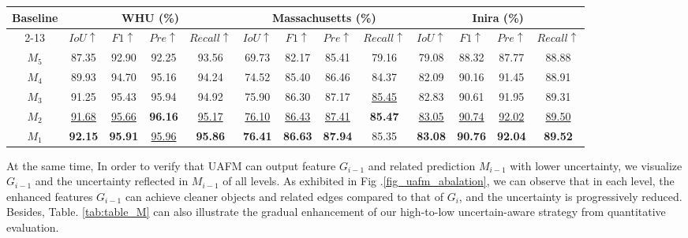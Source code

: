 \documentclass[lettersize,journal]{IEEEtran}
\begin{document}
\begin{table*}[]
\center
\normalsize
\setlength\tabcolsep{3pt}
\caption{The results about $M_{i}$ on the test dataset.}
\label{tab:table_M}
\begin{tabular}{c|cccc|cccc|cccc}
\hline
\multirow{2}{*}{Baseline} & \multicolumn{4}{c|}{WHU (\%)}&\multicolumn{4}{c|}{Massachusetts (\%)} &\multicolumn{4}{c}{Inira (\%)}                                             
 \\ \cline{2-13} 
 & $IoU\uparrow$ & $F1\uparrow$ & $Pre\uparrow$ & $Recall\uparrow$ 
 & $IoU\uparrow$ & $F1\uparrow$ & $Pre\uparrow$ & $Recall\uparrow$
 & $IoU\uparrow$ & $F1\uparrow$ & $Pre\uparrow$ & $Recall\uparrow$ \\ \hline
$M_{5}$&
87.35  &92.90 &92.25 &93.56
&69.73 &82.17 &85.41 &79.16
&79.08 &88.32 &87.77 &88.88\\
$M_{4}$&
89.93 &94.70 &95.16 &94.24
&74.52 &85.40 &86.46 &84.37
&82.09 &90.16 &91.45 &88.91\\ 
$M_{3}$ &
91.25 &95.43 &95.94 &94.92
&75.90 &86.30 &87.17 &\underline{85.45}
&82.83 &90.61 &91.95 &89.31\\ 
$M_{2}$ &
\underline{91.68} &\underline{95.66} &\color{red}\textbf{96.16} &\underline{95.17}
&\underline{76.10} &\underline{86.43} &\underline{87.41} &\color{red}\textbf{85.47}
&\underline{83.05} &\underline{90.74} &\underline{92.02} &\underline{89.50}\\ 
$M_{1}$ &
\color{red}\textbf{92.15} &{\color{red}\textbf{95.91}} &{\underline{95.96}} &\color{red}\textbf{95.86}

& \color{red}\textbf{{76.41}} &\color{red}\textbf{{86.63}} &\color{red}\textbf{87.94} &{85.35}

& {\color{red}\textbf{83.08}} &{\color{red}\textbf{90.76}} &{\color{red}\textbf{92.04}} &{\color{red}\textbf{89.52}}
\\ \hline
\end{tabular}
\vspace{1.0em}
\end{table*}

At the same time, In order to verify that UAFM can output feature $G_{i-1}$ and related prediction $M_{i-1}$ with lower uncertainty, we visualize $G_{i-1}$ and the uncertainty reflected in $M_{i-1}$ of all levels.
As exhibited in Fig .\ref{fig_uafm_abalation}, we can observe that in each level, the enhanced features $G_{i-1}$ can achieve cleaner objects and related edges compared to that of $G_{i}$, and the uncertainty is progressively reduced. Besides, Table. \ref{tab:table_M} can also illustrate the gradual enhancement of our high-to-low uncertain-aware strategy from quantitative evaluation.
\end{document}
